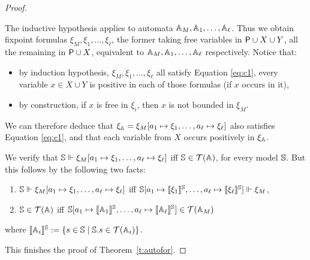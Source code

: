 \begin{proof}
\begin{pfclaim}
The inductive hypothesis applies to automata $\mathbb{A}_M, \mathbb{A}_{1}, \dots, \mathbb{A}_{\ell}$. Thus we obtain fixpoint formulas $\xi_M, \xi_1, \dots, \xi_\ell$, the former taking free variables in $\mathsf{P} \cup X \cup Y$, all the remaining in $\mathsf{P} \cup X$, equivalent to $\mathbb{A}_M, \mathbb{A}_1, \dots, \mathbb{A}_\ell$ respectively.
Notice that:
\begin{itemize}
\item by induction hypothesis, $\xi_M, \xi_1, \dots, \xi_\ell$ all satisfy Equation \ref{eq:c1}, every variable $x \in X \cup Y$ is positive in each of those formulas (if $x$ occurs in it),
\item by construction, if $x$ is free in $\xi_i$, then $x$ is not bounded in $\xi_{M}$.
\end{itemize}
 We can therefore deduce that
 $\xi_\mathbb{A}= \xi_{M}[a_1\mapsto\xi_{1}, \dots, a_\ell\mapsto\xi_{\ell}]$
also satisfies Equation \ref{eq:c1}, and that each variable from $X$ occurs positively in $\xi_\mathbb{A}$.

 We verify that $\mathbb{S} \Vdash \xi_{M}[a_1\mapsto\xi_{1}, \dots, a_\ell\mapsto\xi_{\ell}]$ iff $\mathbb{S} \in \mathcal{T}(\mathbb{A})$, for every model $\mathbb{S}$.
But this follows by the following two facts:
\begin{enumerate}
\item $\mathbb{S}\Vdash \xi_{M}[a_1\mapsto\xi_{1}, \dots, a_\ell\mapsto\xi_{\ell}]$ iff $\mathbb{S}[a_1\mapsto \llbracket\xi_1\rrbracket^{\mathbb{S}}, \dots, a_\ell\mapsto \llbracket\xi_\ell\rrbracket^{\mathbb{S}}  ] \Vdash \xi_M$,
\item $\mathbb{S} \in \mathcal{T}(\mathbb{A})$  iff $\mathbb{S}[a_1\mapsto \llbracket\mathbb{A}_1\rrbracket^{\mathbb{S}}, \dots, a_\ell\mapsto \llbracket\mathbb{A}_\ell\rrbracket^{\mathbb{S}}  ] \in \mathcal{T}(\mathbb{A}_M)$
\end{enumerate}
where %
$\llbracket\mathbb{A}_i\rrbracket^{\mathbb{S}} := \{ s \in \mathbb{S} \mid \mathbb{S}.s \in \mathcal{T}(\mathbb{A}_i) \}$. 
\end{pfclaim}
This finishes the proof of Theorem~\ref{t:autofor}. 
\end{proof}
